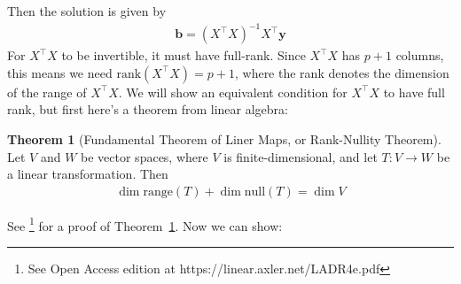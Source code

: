 \documentclass[12pt, a4paper]{article}
\theoremstyle{definition}
\newtheorem{theorem}{Theorem}
\begin{document}
	Then the solution is given by
	\begin{align}
		\mathbf{b} = (X^\top X)^{-1}X^\top\mathbf{y}\label{eqn:multivar-ols-coeffs}
	\end{align}
	For $X^\top X$ to be invertible, it must have full-rank. Since $X^\top X$ has $p+1$
	columns, this means we need $\text{rank}(X^\top X)= p + 1$, where the rank denotes
	the dimension of the range of $X^\top X$. We will show an equivalent condition
	for $X^\top X$ to have full rank, but first here's a theorem from linear algebra:
	\begin{tcolorbox}[breakable]
		\begin{theorem}[Fundamental Theorem of Liner Maps, or Rank-Nullity Theorem]
			\label{thm:rank-nullity}
			Let $V$ and $W$ be vector spaces, where $V$ is finite-dimensional, and let
			$T:V\to W$ be a linear transformation. Then
			\begin{align*}
				\dim \text{range}(T) + \dim \text{null}(T) = \dim V
			\end{align*}
		\end{theorem}
	\end{tcolorbox}
	See \cite{axler}\footnote{See Open Access edition at https://linear.axler.net/LADR4e.pdf} for a proof of Theorem~\ref{thm:rank-nullity}.
	Now we can show:
\end{document}

